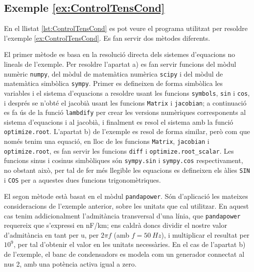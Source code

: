 \hypertarget{exemple:ControlTensCond}{\subsection{Exemple \ref*{ex:ControlTensCond} \ControlTensCond}}
En el llistat \vref{lst:ControlTensCond} es pot veure el programa utilitzat per resoldre l'exemple \vref{ex:ControlTensCond}. Es fan servir dos mètodes diferents.

El primer mètode es basa en la resolució directa dels sistemes d'equacions no lineals de l'exemple. Per resoldre l'apartat a)   es fan servir funcions del mòdul numèric \texttt{numpy}, del mòdul de matemàtica numèrica \texttt{scipy} i del mòdul de matemàtica simbòlica \texttt{sympy}. Primer es defineixen de forma simbòlica les variables i el sistema d'equacions a resoldre usant les funcions \texttt{symbols}, \texttt{sin} i \texttt{cos}, i després se n'obté el jacobià usant les funcions \texttt{Matrix} i \texttt{jacobian}; a continuació es fa ús de la funció  \texttt{lambdify} per crear les versions numèriques corresponents al sistema d'equacions i al jacobià, i finalment es resol el sistema amb la funció \texttt{optimize.root}. L'apartat b) de l'exemple es resol de forma similar, però com que només tenim una equació, en lloc de les funcions \texttt{Matrix}, \texttt{jacobian} i \texttt{optimize.root}, es fan servir les funcions \texttt{diff} i \texttt{optimize.root\_scalar}. Les funcions sinus i cosinus simbòliques són  \texttt{sympy.sin} i  \texttt{sympy.cos} respectivament, no obstant això,  per tal de fer més llegible les equacions es defineixen els àlies \texttt{SIN} i \texttt{COS} per a aquestes dues funcions trigonomètriques.

El segon mètode està basat en el mòdul \texttt{pandapower}. Són d'aplicació les mateixes consideracions de l'exemple anterior, sobre les unitats que cal utilitzar. En aquest cas tenim addicionalment l'admitància transversal d'una línia, que \texttt{pandapower} requereix que s'expressi en \unit{nF/km}; ens caldrà doncs dividir el nostre valor d'admitància en tant per u, per $2 \pi f$ (amb $f = \qty{50}{Hz}$), i multiplicar el resultat per $10^9$, per tal d'obtenir el valor en les unitats necessàries. En el cas de l'apartat  b) de l'exemple, el banc de condensadors es modela com un generador connectat al nus 2, amb una potència activa  igual a zero.




